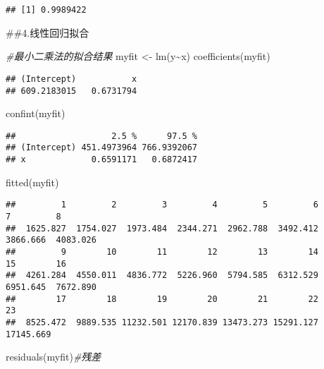 \documentclass[
]{article}
\newenvironment{Shaded}{\begin{snugshade}}{\end{snugshade}}
\newcommand{\CommentTok}[1]{\textcolor[rgb]{0.56,0.35,0.01}{\textit{#1}}}
\newcommand{\FunctionTok}[1]{\textcolor[rgb]{0.00,0.00,0.00}{#1}}
\newcommand{\NormalTok}[1]{#1}
\newcommand{\OtherTok}[1]{\textcolor[rgb]{0.56,0.35,0.01}{#1}}
\newcommand{\SpecialCharTok}[1]{\textcolor[rgb]{0.00,0.00,0.00}{#1}}
\begin{document}
\begin{verbatim}
## [1] 0.9989422
\end{verbatim}

\#\#4.线性回归拟合

\begin{Shaded}
\begin{Highlighting}[]
\CommentTok{\#最小二乘法的拟合结果}
\NormalTok{myfit }\OtherTok{\textless{}{-}} \FunctionTok{lm}\NormalTok{(y}\SpecialCharTok{\textasciitilde{}}\NormalTok{x)}
\FunctionTok{coefficients}\NormalTok{(myfit) }
\end{Highlighting}
\end{Shaded}

\begin{verbatim}
## (Intercept)           x 
## 609.2183015   0.6731794
\end{verbatim}

\begin{Shaded}
\begin{Highlighting}[]
\FunctionTok{confint}\NormalTok{(myfit)}
\end{Highlighting}
\end{Shaded}

\begin{verbatim}
##                   2.5 %      97.5 %
## (Intercept) 451.4973964 766.9392067
## x             0.6591171   0.6872417
\end{verbatim}

\begin{Shaded}
\begin{Highlighting}[]
\FunctionTok{fitted}\NormalTok{(myfit)}
\end{Highlighting}
\end{Shaded}

\begin{verbatim}
##         1         2         3         4         5         6         7         8 
##  1625.827  1754.027  1973.484  2344.271  2962.788  3492.412  3866.666  4083.026 
##         9        10        11        12        13        14        15        16 
##  4261.284  4550.011  4836.772  5226.960  5794.585  6312.529  6951.645  7672.890 
##        17        18        19        20        21        22        23 
##  8525.472  9889.535 11232.501 12170.839 13473.273 15291.127 17145.669
\end{verbatim}

\begin{Shaded}
\begin{Highlighting}[]
\FunctionTok{residuals}\NormalTok{(myfit)}\CommentTok{\#残差}
\end{Highlighting}
\end{Shaded}
\end{document}
